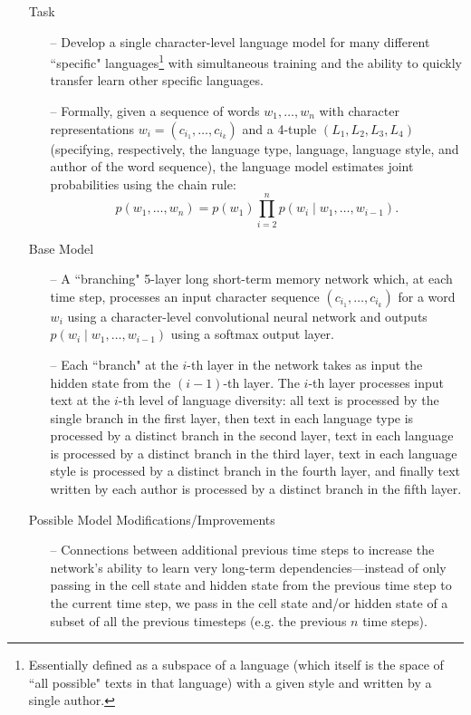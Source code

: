 \documentclass[12pt,letterpaper]{article}
\theoremstyle{remark}
\theoremstyle{plain}
\begin{document}
\begin{enumerate}
\item[] Task
\begin{enumerate}
\item[--] Develop a single character-level language model for many different ``specific" languages\footnote{Essentially defined as a subspace of a language (which itself is the space of ``all possible" texts in that language) with a given style and written by a single author.} with simultaneous training and the ability to quickly transfer learn other specific languages.
\item[--] Formally, given a sequence of words $w_{1}, \ldots, w_{n}$ with character representations $w_{i} = (c_{i_{1}}, \ldots, c_{i_{k}})$ and a 4-tuple $(L_{1}, L_{2}, L_{3}, L_{4})$ (specifying, respectively, the language type, language, language style, and author of the word sequence), the language model estimates joint probabilities using the chain rule:
$$p(w_{1}, \ldots, w_{n}) = p(w_{1})\prod_{i=2}^{n}p(w_{i} \mid w_{1}, \ldots, w_{i-1}).$$
\end{enumerate}
\item[] Base Model
\begin{enumerate}
\item[--] A ``branching" 5-layer long short-term memory network which, at each time step, processes an input character sequence $(c_{i_{1}}, \ldots, c_{i_{k}})$ for a word $w_{i}$ using a character-level convolutional neural network and outputs $p(w_{i} \mid w_{1}, \ldots, w_{i-1})$ using a softmax output layer. 
\item[--] Each ``branch" at the $i$-th layer in the network takes as input the hidden state from the $(i-1)$-th layer. The $i$-th layer processes input text at the $i$-th level of language diversity: all text is processed by the single branch in the first layer, then text in each language type is processed by a distinct branch in the second layer, text in each language is processed by a distinct branch in the third layer, text in each language style is processed by a distinct branch in the fourth layer, and finally text written by each author is processed by a distinct branch in the fifth layer. 
\end{enumerate}
\item[] Possible Model Modifications/Improvements
\begin{enumerate}
\item[--] Connections between additional previous time steps to increase the network's ability to learn very long-term dependencies---instead of only passing in the cell state and hidden state from the previous time step to the current time step, we pass in the cell state and/or hidden state of a subset of all the previous timesteps (e.g. the previous $n$ time steps). 

\end{enumerate}
\end{enumerate}
\end{document}

